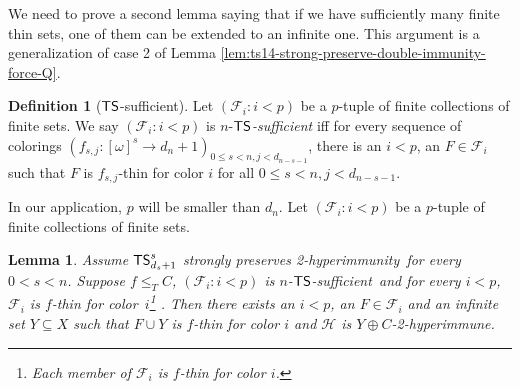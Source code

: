 \documentclass{amsart}
\newtheorem{lemma}[theorem]{Lemma}
\theoremstyle{definition}
\newtheorem{definition}[theorem]{Definition}
\theoremstyle{remark}
\numberwithin{equation}{section}
\theoremstyle{noparens}
\def\propertyL{2-hyperimmunity}
\def\hyper{2-hyperimmune}
\def\mcal{\mathcal}
\newcommand{\Hcal}{\mathcal{H}}
\newcommand{\s}[1]{\ensuremath{\sf{#1}}}
\DeclareMathOperator{\ts}{\s{TS}}
\def\tssufficient{$\ts$-sufficient}
\begin{document}
We need to prove a second lemma saying that if we have sufficiently many finite thin sets,
one of them can be extended to an infinite one.
This argument is a generalization of case 2 of Lemma
\ref{lem:ts14-strong-preserve-double-immunity-force-Q}.
\begin{definition}[\tssufficient]
\label{def:tssuff}
Let $(\mcal{F}_i:i<p)$ be a $p$-tuple of finite collections
of finite sets.
We say $(\mcal{F}_i:i<p)$
is $n$-\emph{\tssufficient}
iff for every
sequence of colorings $(f_{s,j}:[\omega]^s\rightarrow  d_n+1)_{0\leq s<n, j< d_{n-s-1}}$,
there is an $i<p$, an $F\in\mcal{F}_i$ such that
$F$ is $f_{s,j}$-thin for color $i$
for all $0\leq s<n, j<d_{n-s-1}$.
\end{definition}
In our application, $p$ will be smaller than $d_n$.
Let $(\mcal{F}_i:i<p)$ be a $p$-tuple of finite collections
of finite  sets.
\begin{lemma}\label{lem:tssuff}
Assume $\ts^s_{d_s+1}$ strongly
preserves \propertyL\ for every  $0<s <n$.
Suppose $f\leq_T C$, $(\mcal{F}_i:i<p)$
is $n$-\tssufficient\ and for every $i < p$, $ \mcal{F}_i$ is $f$-thin for color~$i$\footnote{Each member of $\mcal{F}_i$ is $f$-thin for color $i$.} .
Then there exists an $i<p$, an $F\in\mcal{F}_i$
and an infinite set $Y\subseteq X$
such that $F\cup Y$ is $f$-thin for color $i$ and $\Hcal$ is $Y\oplus C$-\hyper.
\end{lemma}
\end{document}
